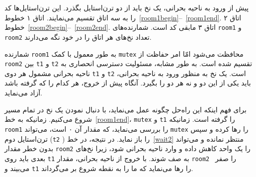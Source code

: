 \documentclass{book}
\begin{document}
    پیش از ورود به ناحیه بحرانی، یک نخ باید از دو ترن‌استایل بگذرد. 
    این ترن‌استایل‌ها کد را به سه اتاق تقسیم می‌نمایند. اتاق ۱ خطوط~\ref{room1begin}--~\ref{room1end}.
    اتاق ۲ خطوط~\ref{room2begin}--~\ref{room2end}. اتاق ۳ مابقی  کد  است. 
    شمارنده‌های {\tt room1} و {\tt room2} تعداد نخ‌های هر اتاق را در خود نگه می‌دارند. 

    شمارنده  {\tt room1}  به طور معمول با کمک {\tt mutex} محافظت می‌شود امّا امر حفاظت از {\tt room2} 
    بین {\tt t1} و {\tt t2} تقسیم شده است. به طور مشابه، مسئولیت دسترسی انحصاری به ناحیه بحرانی مشمول هر دوی {\tt t1} و {\tt t2} است. 
    یک نخ به منظور ورود به ناحیه بحرانی،  باید یکی از این دو و نه هر دو را بگیرد. آنگاه پیش از خروج، هر کدام را که گرفته باشد آزاد می‌نماید. 

    برای فهم اینکه این راه‌حل چگونه عمل می‌نماید، با دنبال نمودن یک نخ در تمام مسیر شروع می‌کنیم. 
    زمانیکه به خط~\ref{room1end}، {\tt mutex} و {\tt t1}  را گرفته است. زمانیکه {\tt room1}  را بررسی می‌نماید، که مقدار آن ۰ است، 
    می‌تواند {\tt mutex} را رها کرده و سپس ترن‌استایل دوم ({\tt t2} ) را باز نماید. در نتیجه، در خط~\ref{wait2} منتظر نمانده و می‌تواند بدون خطر 
    مقدار {\tt room2} را یک واحد کاهش داده  و وارد ناحیه بحرانی شود، زیرا نخ‌های بعدی باید روی  {\tt t1} به صف شوند. 
    با خروج از ناحیه بحرانی، مقدار  {\tt room2 } را صفر می‌بیند و {\tt t1} را رها می‌نماید که ما را به نقطه شروع بر می‌گرداند. 
\end{document}
